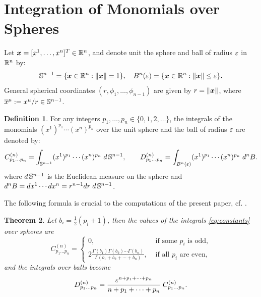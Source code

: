 \documentclass[letterpaper, reqno, 11pt]{amsart}
\newtheorem{theorem}{Theorem}[section]
\theoremstyle{definition}
\newtheorem{definition}[theorem]{Definition}
\theoremstyle{remark}
\numberwithin{equation}{section}
\begin{document}
%
%
%
\appendix
\section{Integration of Monomials over Spheres}\label{sec:appendix}
Let $\boldsymbol{x} =[x^1,\dots,x^n ]^T\in{\mathbb R}^n$, and denote unit the sphere and ball of radius $\varepsilon$ in ${\mathbb R}^n$ by:
$$
{\mathbb S}^{n-1}=\{\boldsymbol{x}\in{\mathbb R}^n : \|\boldsymbol{x}\|=1 \},\quad B^{n}(\varepsilon)=\{\boldsymbol{x}\in{\mathbb R}^n : \|\boldsymbol{x}\|\leq\varepsilon \}.
$$
General spherical coordinates $(r,\phi_1,\dots,\phi_{n-1})$ are given by $r=\|\boldsymbol{x}\|$, where $\overline{x}^\mu :=x^\mu / r\in{\mathbb S}^{n-1}$.
\begin{definition}
 For any integers $p_1,\dots,p_n\in\{0,1,2,\dots\}$, the integrals of the monomials $(x^1)^{p_1}\cdots (x^n)^{p_n}$ over the unit sphere and the ball of radius $\varepsilon$ are denoted by:
\begin{equation}\label{eq:constants}
	C^{(n)}_{p_1\dots p_n}=\int_{{\mathbb S}^{n-1}} (x^1)^{p_1}\cdots (x^n)^{p_n}\; d\,{\mathbb S}^{n-1},\quad\quad
	D^{(n)}_{p_1\dots p_n}=\int_{B^n(\varepsilon)} (x^1)^{p_1}\cdots (x^n)^{p_n}\; d^nB.
\end{equation}
where $d\,{\mathbb S}^{n-1}$ is the Euclidean measure on the sphere and $d^nB=dx^1\cdots dx^n=r^{n-1}dr\;d\,{\mathbb S}^{n-1}$.
\end{definition}

The following formula is crucial to the computations of the present paper, cf. \cite{folland2001}.

\begin{theorem}\label{th:folland}
	Let $b_i=\frac{1}{2}(p_i+1)$, then the values of the integrals \ref{eq:constants} over spheres are
\begin{equation}
	C^{(n)}_{p_1\dots p_n}=\begin{cases}
		0, & \text{ if some $p_i$ is odd,} \\ \displaystyle
		2\frac{\Gamma(b_1)\Gamma(b_2)\cdots\Gamma(b_n)}{\Gamma(b_1+b_2+\cdots +b_n)}, & \text{ if all $p_i$ are even},
	\end{cases}
\end{equation}
and the integrals over balls become
\begin{equation}
	D^{(n)}_{p_1\dots p_n}=\frac{\varepsilon^{n+p_1+\cdots+p_n}}{n+p_1+\cdots+p_n}\; C^{(n)}_{p_1\dots p_n}.
\end{equation}
\end{theorem}
\end{document}
